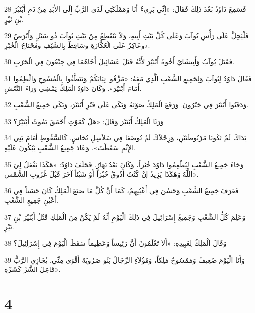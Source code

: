 \par 28 فَسَمِعَ دَاوُدُ بَعْدَ ذَلِكَ فَقَالَ: «إِنِّي بَرِيءٌ أَنَا وَمَمْلَكَتِي لَدَى الرَّبِّ إِلَى الأَبَدِ مِنْ دَمِ أَبْنَيْرَ بْنِ نَيْرٍ.
\par 29 فَلْيَحِلَّ عَلَى رَأْسِ يُوآبَ وَعَلَى كُلِّ بَيْتِ أَبِيهِ، وَلاَ يَنْقَطِعُ مِنْ بَيْتِ يُوآبَ ذُو سَيْلٍ وَأَبْرَصُ وَعَاكِزٌ عَلَى الْعُكَّازَةِ وَسَاقِطٌ بِالسَّيْفِ وَمُحْتَاجُ الْخُبْزِ».
\par 30 فَقَتَلَ يُوآبُ وَأَبِيشَايُ أَخُوهُ أَبْنَيْرَ لأَنَّهُ قَتَلَ عَسَائِيلَ أَخَاهُمَا فِي جِبْعُونَ فِي الْحَرْبِ.
\par 31 فَقَالَ دَاوُدُ لِيُوآبَ وَلِجَمِيعِ الشَّعْبِ الَّذِي مَعَهُ: «مَزِّقُوا ثِيَابَكُمْ وَتَنَطَّقُوا بِالْمُسُوحِ وَالْطِمُوا أَمَامَ أَبْنَيْرَ». وَكَانَ دَاوُدُ الْمَلِكُ يَمْشِي وَرَاءَ النَّعْشِ.
\par 32 وَدَفَنُوا أَبْنَيْرَ فِي حَبْرُونَ. وَرَفَعَ الْمَلِكُ صَوْتَهُ وَبَكَى عَلَى قَبْرِ أَبْنَيْرَ، وَبَكَى جَمِيعُ الشَّعْبِ.
\par 33 وَرَثَا الْمَلِكُ أَبْنَيْرَ وَقَالَ: «هَلْ كَمَوْتِ أَحْمَقَ يَمُوتُ أَبْنَيْرُ؟
\par 34 يَدَاكَ لَمْ تَكُونَا مَرْبُوطَتَيْنِ، وَرِجْلاَكَ لَمْ تُوضَعَا فِي سَلاَسِلِ نُحَاسٍ. كَالسُّقُوطِ أَمَامَ بَنِي الإِثْمِ سَقَطْتَ». وَعَادَ جَمِيعُ الشَّعْبِ يَبْكُونَ عَلَيْهِ.
\par 35 وَجَاءَ جَمِيعُ الشَّعْبِ لِيُطْعِمُوا دَاوُدَ خُبْزاً، وَكَانَ بَعْدُ نَهَارٌ. فَحَلَفَ دَاوُدُ: «هَكَذَا يَفْعَلُ لِيَ اللَّهُ وَهَكَذَا يَزِيدُ إِنْ كُنْتُ أَذُوقُ خُبْزاً أَوْ شَيْئاً آخَرَ قَبْلَ غُرُوبِ الشَّمْسِ».
\par 36 فَعَرَفَ جَمِيعُ الشَّعْبِ وَحَسُنَ فِي أَعْيُنِهِمْ، كَمَا أَنَّ كُلَّ مَا صَنَعَ الْمَلِكُ كَانَ حَسَناً فِي أَعْيُنِ جَمِيعِ الشَّعْبِ.
\par 37 وَعَلِمَ كُلُّ الشَّعْبِ وَجَمِيعُ إِسْرَائِيلَ فِي ذَلِكَ الْيَوْمِ أَنَّهُ لَمْ يَكُنْ مِنَ الْمَلِكِ قَتْلُ أَبْنَيْرَ بْنِ نَيْرٍ.
\par 38 وَقَالَ الْمَلِكُ لِعَبِيدِهِ: «أَلاَ تَعْلَمُونَ أَنَّ رَئِيساً وَعَظِيماً سَقَطَ الْيَوْمَ فِي إِسْرَائِيلَ؟
\par 39 وَأَنَا الْيَوْمَ ضَعِيفٌ وَمَمْسُوحٌ مَلِكاً، وَهَؤُلاَءِ الرِّجَالُ بَنُو صَرُويَةَ أَقْوَى مِنِّي. يُجَازِي الرَّبُّ فَاعِلَ الشَّرِّ كَشَرِّهِ».

\chapter{4}

